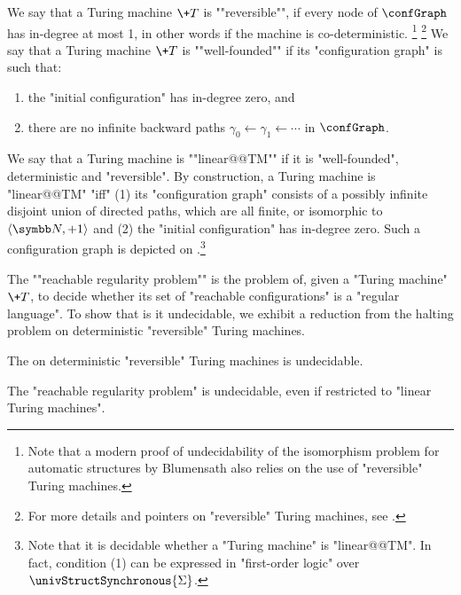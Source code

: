 \AP We say that a Turing machine $\+T$ is ""reversible"", if every node of $\confGraph$ has in-degree at most 1, in other words if the machine is co-deterministic.%
\footnote{
    Note that a modern proof of undecidability of the isomorphism problem for automatic structures 
    by Blumensath \cite[\S VIII. Theorem 4.3, p. 396 \& second claim, p. 398]{Blumensath2023MSO} 
    also relies on the use of "reversible" Turing machines.
}%
\footnote{
    For more details and pointers on "reversible" Turing machines,
    see \cite[Chapter 5]{Morita2017Reversible}.
}
We say that a Turing machine $\+T$ is ""well-founded"" if its "configuration graph" is such that:
\begin{enumerate}
    \item the "initial configuration" has in-degree zero, and
    \item there are no infinite backward paths $\gamma_0 \leftarrow \gamma_1 \leftarrow \cdots$ in $\confGraph$. 
\end{enumerate}

We say that a Turing machine is ""linear@@TM"" if it is "well-founded", deterministic and "reversible".
By construction, a Turing machine is "linear@@TM" "iff" (1) its "configuration graph" consists of a possibly infinite disjoint union of directed paths, which are all finite, or isomorphic to $\tup{\N, +1}$ and (2) the "initial configuration" has in-degree zero.
Such a configuration graph is depicted on
.\footnote{Note
that it is decidable whether a "Turing machine" is "linear@@TM". In fact, condition (1) can be expressed in "first-order logic" over $\univStructSynchronous{\Sigma}$.}

\AP The ""reachable regularity problem"" is the problem of, given a "Turing machine" $\+T$, to decide whether its set of "reachable configurations" is a "regular language". To show that is it undecidable, we exhibit a reduction from the halting problem on deterministic "reversible" Turing machines.

\begin{proposition}
    \AP\label{prop:halting-problem-detrevTM}
    The  on deterministic "reversible" Turing machines is undecidable.
\end{proposition}

\begin{lemma}
    \AP\label{lem:reachable-regularity}
    The "reachable regularity problem" is undecidable, even if restricted
    to "linear Turing machines".
\end{lemma}

